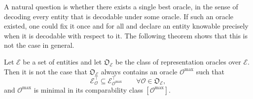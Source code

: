 A natural question is whether there exists a single best oracle, in the sense of decoding every entity that is decodable under some oracle. If such an oracle existed, one could fix it once and for all and declare an entity knowable precisely when it is decodable with respect to it. The following theorem shows that this is not the case in general.

\begin{theorem}
\label{thm:no_maximal_oracle}
Let $\mathcal{E}$ be a set of entities and let $\mathfrak{O}_{\mathcal{E}}$ be the class of representation oracles over $\mathcal{E}$. Then it is not the case that $\mathfrak{O}_{\mathcal{E}}$ always contains an oracle $\mathcal{O}^{\max}$ such that
\[
\mathcal{E}^{\top}_{\mathcal{O}}
\subseteq
\mathcal{E}^{\top}_{\mathcal{O}^{\max}}
\qquad
\forall \mathcal{O} \in \mathfrak{O}_{\mathcal{E}},
\]
and $\mathcal{O}^{\max}$ is minimal in its comparability class $[\mathcal{O}^{\max}]$.
\end{theorem}

